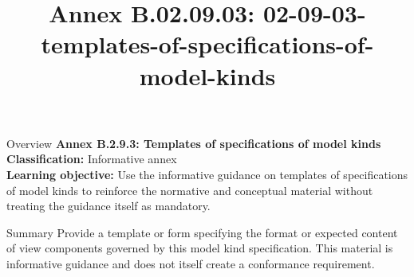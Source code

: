 \documentclass[10pt,letterpaper]{article}
\title{Annex B.02.09.03: 02-09-03-templates-of-specifications-of-model-kinds}
\author{}
\date{}
\begin{document}
\maketitle
\begin{CornellOverviewBox}{Overview}
{\Large\bfseries\textcolor{CNavy}{Annex B.2.9.3: Templates of specifications of model kinds}}\\[3pt]
{\small\textbf{Classification:} Informative annex}\\
{\small\textbf{Learning objective:} Use the informative guidance on templates of specifications of model kinds to reinforce the normative and conceptual material without treating the guidance itself as mandatory.}
\end{CornellOverviewBox}
\vspace{3pt}

\begin{CornellNotesTable}
\end{CornellNotesTable}


\begin{CornellSummaryBox}{Summary}
Provide a template or form specifying the format or expected content of view components governed by this model kind specification. This material is informative guidance and does not itself create a conformance requirement.
\end{CornellSummaryBox}
\end{document}
